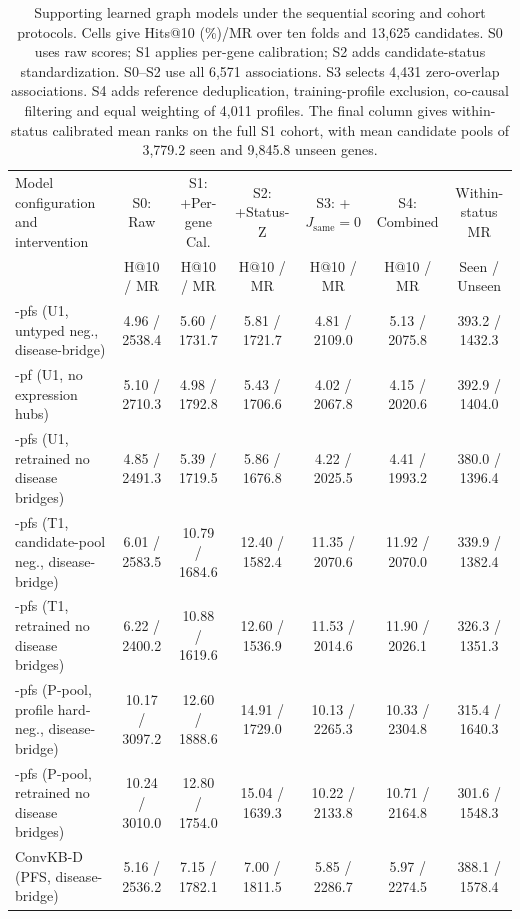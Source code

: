 \begin{landscape}
\begin{table}[p]
\centering\scriptsize
\renewcommand{\arraystretch}{0.86}
\setlength{\tabcolsep}{1.6pt}
\caption{Supporting learned graph models under the sequential scoring and cohort protocols. Cells give Hits@10 (\%)/MR over ten folds and 13,625 candidates. S0 uses raw scores; S1 applies per-gene calibration; S2 adds candidate-status standardization. S0--S2 use all 6,571 associations. S3 selects 4,431 zero-overlap associations. S4 adds reference deduplication, training-profile exclusion, co-causal filtering and equal weighting of 4,011 profiles. The final column gives within-status calibrated mean ranks on the full S1 cohort, with mean candidate pools of 3,779.2 seen and 9,845.8 unseen genes.}
\label{tab:bias_stepwise}
\begin{tabular}{lcccccc}
\toprule
Model configuration and intervention & S0: Raw & S1: +Per-gene Cal. & S2: +Status-Z & S3: +$J_{\mathrm{same}}{=}0$ & S4: Combined & Within-status MR \\
 & H@10 / MR & H@10 / MR & H@10 / MR & H@10 / MR & H@10 / MR & Seen / Unseen \\
\midrule
\method{}-pfs (U1, untyped neg., disease-bridge) & 4.96 / 2538.4 & 5.60 / 1731.7 & 5.81 / 1721.7 & 4.81 / 2109.0 & 5.13 / 2075.8 & 393.2 / 1432.3 \\
\method{}-pf (U1, no expression hubs) & 5.10 / 2710.3 & 4.98 / 1792.8 & 5.43 / 1706.6 & 4.02 / 2067.8 & 4.15 / 2020.6 & 392.9 / 1404.0 \\
\method{}-pfs (U1, retrained no disease bridges) & 4.85 / 2491.3 & 5.39 / 1719.5 & 5.86 / 1676.8 & 4.22 / 2025.5 & 4.41 / 1993.2 & 380.0 / 1396.4 \\
\method{}-pfs (T1, candidate-pool neg., disease-bridge) & 6.01 / 2583.5 & 10.79 / 1684.6 & 12.40 / 1582.4 & 11.35 / 2070.6 & 11.92 / 2070.0 & 339.9 / 1382.4 \\
\method{}-pfs (T1, retrained no disease bridges) & 6.22 / 2400.2 & 10.88 / 1619.6 & 12.60 / 1536.9 & 11.53 / 2014.6 & 11.90 / 2026.1 & 326.3 / 1351.3 \\
\method{}-pfs (P-pool, profile hard-neg., disease-bridge) & 10.17 / 3097.2 & 12.60 / 1888.6 & 14.91 / 1729.0 & 10.13 / 2265.3 & 10.33 / 2304.8 & 315.4 / 1640.3 \\
\method{}-pfs (P-pool, retrained no disease bridges) & 10.24 / 3010.0 & 12.80 / 1754.0 & 15.04 / 1639.3 & 10.22 / 2133.8 & 10.71 / 2164.8 & 301.6 / 1548.3 \\
ConvKB-D (PFS, disease-bridge) & 5.16 / 2536.2 & 7.15 / 1782.1 & 7.00 / 1811.5 & 5.85 / 2286.7 & 5.97 / 2274.5 & 388.1 / 1578.4 \\

\end{tabular}
\end{table}
\end{landscape}
